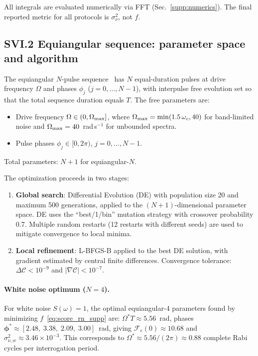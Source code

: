 \documentclass[aps,pra,twocolumn,superscriptaddress,longbibliography]{revtex4-2}
\begin{document}
All integrals are evaluated numerically via FFT (Sec.~\ref{supp:numerics}).
The final reported metric for all protocols is $\sigma^2_\nu$, not $f$.

\subsection*{SVI.2 Equiangular sequence: parameter space and algorithm}

The equiangular $N$-pulse sequence~\cite{Cummins2003} has $N$ equal-duration pulses
at drive frequency $\Omega$ and phases $\phi_j$ ($j=0,\ldots,N-1$), with interpulse
free evolution set so that the total sequence duration equals $T$.
The free parameters are:
\begin{itemize}
  \item Drive frequency $\Omega \in (0, \Omega_{\rm max}]$, where
        $\Omega_{\rm max} = \min(1.5\,\omega_c, 40)$ for band-limited noise and
        $\Omega_{\rm max} = 40$~rad\,s$^{-1}$ for unbounded spectra.
  \item Pulse phases $\phi_j \in [0, 2\pi)$, $j = 0,\ldots,N-1$.
\end{itemize}
Total parameters: $N+1$ for equiangular-$N$.

The optimization proceeds in two stages:
\begin{enumerate}
  \item \textbf{Global search}: Differential Evolution (DE) with population size 20
        and maximum 500 generations, applied to the $(N+1)$-dimensional parameter space.
        DE uses the ``best/1/bin'' mutation strategy with crossover probability 0.7.
        Multiple random restarts (12 restarts with different seeds) are used to
        mitigate convergence to local minima.
  \item \textbf{Local refinement}: L-BFGS-B applied to the best DE solution,
        with gradient estimated by central finite differences.
        Convergence tolerance: $\Delta\mathcal{C} < 10^{-9}$ and
        $|\nabla\mathcal{C}| < 10^{-7}$.
\end{enumerate}

\paragraph{White noise optimum ($N=4$).}
For white noise $S(\omega)=1$, the optimal equiangular-4 parameters found by
minimizing $f$~\eqref{eq:score_rn_supp} are:
$\Omega^* T \approx 5.56$~rad, phases $\boldsymbol{\phi}^* \approx [2.48,\; 3.38,\; 2.09,\; 3.00]$~rad,
giving $\mathcal{F}_e(0)\approx10.68$ and $\sigma^2_{\nu,w}\approx3.46\times10^{-3}$.
This corresponds to $\Omega^* \approx 5.56/(2\pi) \approx 0.88$ complete Rabi cycles
per interrogation period.
\end{document}

